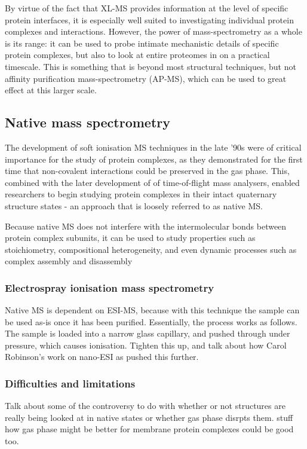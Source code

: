 \documentclass[a4paper,11pt,twoside,openright]{scrbook}
\begin{document}
By virtue of the fact that XL-MS provides information at the level of specific protein interfaces, it is especially well suited to investigating individual protein complexes and interactions. However, the power of mass-spectrometry as a whole is its range: it can be used to probe intimate mechanistic details of specific protein complexes, but also to look at entire proteomes in on a practical timescale. This is something that is beyond most structural techniques, but not affinity purification mass-spectrometry (AP-MS), which can be used to great effect at this larger scale.

\subsection{Native mass spectrometry}
The development of soft ionisation MS techniques in the late '90s were of critical importance for the study of protein complexes, as they demonstrated for the first time that non-covalent interactions could be preserved in the gas phase. This, combined with the later development of of time-of-flight mass analysers, enabled researchers to begin studying protein complexes in their intact quaternary structure states - an approach that is loosely referred to as native MS.

Because native MS does not interfere with the intermolecular bonds between protein complex subunits, it can be used to study properties such as stoichiometry, compositional heterogeneity, and even dynamic processes such as complex assembly and disassembly

\subsubsection{Electrospray ionisation mass spectrometry}
Native MS is dependent on ESI-MS, because with this technique the sample can be used as-is once it has been purified. Essentially, the process works as follows. The sample is loaded into a narrow glass capillary, and pushed through under pressure, which causes ionisation. Tighten this up, and talk about how Carol Robinson's work on nano-ESI as pushed this further.

\subsubsection{Difficulties and limitations}
Talk about some of the controversy to do with whether or not structures are really being looked at in native states or whether gas phase disrpts them. stuff how gas phase might be better for membrane protein complexes could be good too.
\end{document}
